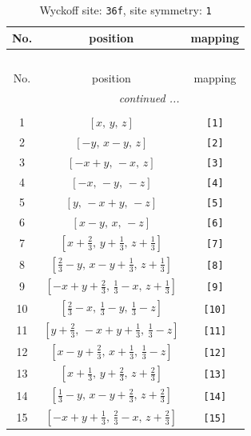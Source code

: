 \documentclass[fleqn,8pt]{jsarticle}
\begin{document}
\renewcommand{\arraystretch}{1.2}
\begin{longtable}{ccc}
\caption{Wyckoff site: {\tt 36f}, site symmetry: {\tt 1}}
 \\
 \hline \hline
No. & position & mapping \\ \hline \endfirsthead

\multicolumn{2}{l}{\tablename\ \thetable{}} \\
 \hline \hline
No. & position & mapping \\ \hline \endhead

 \hline \hline
\multicolumn{2}{r}{\footnotesize\it continued ...} \\ \endfoot

 \hline \hline
\multicolumn{2}{r}{} \\ \endlastfoot

1 & $\left[ x,\, y,\, z \right]$ & {\tt [1]} \\ \hline
2 & $\left[ - y,\, x - y,\, z \right]$ & {\tt [2]} \\ \hline
3 & $\left[ - x + y,\, - x,\, z \right]$ & {\tt [3]} \\ \hline
4 & $\left[ - x,\, - y,\, - z \right]$ & {\tt [4]} \\ \hline
5 & $\left[ y,\, - x + y,\, - z \right]$ & {\tt [5]} \\ \hline
6 & $\left[ x - y,\, x,\, - z \right]$ & {\tt [6]} \\ \hline
7 & $\left[ x + \frac{2}{3},\, y + \frac{1}{3},\, z + \frac{1}{3} \right]$ & {\tt [7]} \\ \hline
8 & $\left[ \frac{2}{3} - y,\, x - y + \frac{1}{3},\, z + \frac{1}{3} \right]$ & {\tt [8]} \\ \hline
9 & $\left[ - x + y + \frac{2}{3},\, \frac{1}{3} - x,\, z + \frac{1}{3} \right]$ & {\tt [9]} \\ \hline
10 & $\left[ \frac{2}{3} - x,\, \frac{1}{3} - y,\, \frac{1}{3} - z \right]$ & {\tt [10]} \\ \hline
11 & $\left[ y + \frac{2}{3},\, - x + y + \frac{1}{3},\, \frac{1}{3} - z \right]$ & {\tt [11]} \\ \hline
12 & $\left[ x - y + \frac{2}{3},\, x + \frac{1}{3},\, \frac{1}{3} - z \right]$ & {\tt [12]} \\ \hline
13 & $\left[ x + \frac{1}{3},\, y + \frac{2}{3},\, z + \frac{2}{3} \right]$ & {\tt [13]} \\ \hline
14 & $\left[ \frac{1}{3} - y,\, x - y + \frac{2}{3},\, z + \frac{2}{3} \right]$ & {\tt [14]} \\ \hline
15 & $\left[ - x + y + \frac{1}{3},\, \frac{2}{3} - x,\, z + \frac{2}{3} \right]$ & {\tt [15]} \\ \hline

\end{longtable}
\end{document}
